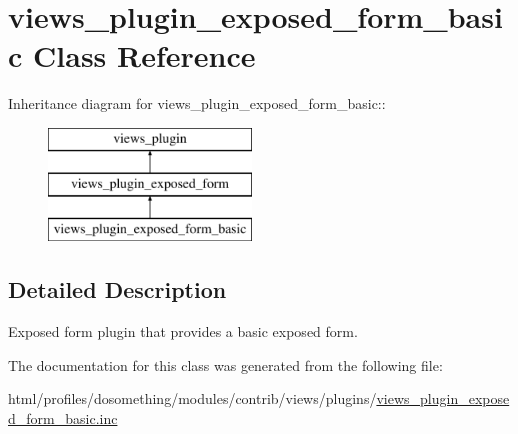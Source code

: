 \hypertarget{classviews__plugin__exposed__form__basic}{
\section{views\_\-plugin\_\-exposed\_\-form\_\-basic Class Reference}
\label{classviews__plugin__exposed__form__basic}
}
Inheritance diagram for views\_\-plugin\_\-exposed\_\-form\_\-basic::\begin{figure}[H]
\begin{center}
\leavevmode
\includegraphics[height=3cm]{classviews__plugin__exposed__form__basic}
\end{center}
\end{figure}


\subsection{Detailed Description}
Exposed form plugin that provides a basic exposed form. 

The documentation for this class was generated from the following file:\begin{DoxyCompactItemize}
\item 
html/profiles/dosomething/modules/contrib/views/plugins/\hyperlink{views__plugin__exposed__form__basic_8inc}{views\_\-plugin\_\-exposed\_\-form\_\-basic.inc}\end{DoxyCompactItemize}
